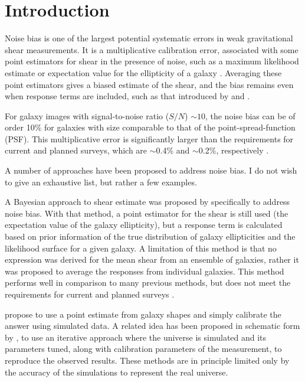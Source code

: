 \documentclass[usegraphicx,usenatbib]{mn2e}
\newcommand{\sn}{$S/N$}
\begin{document}
\section{Introduction} \label{sec:intro}


Noise bias is one of the largest potential systematic errors in weak
gravitational shear measurements.  It is a multiplicative calibration
error, associated with some point estimators for shear in the presence of
noise, such as a maximum likelihood estimate or expectation value for the
ellipticity of a galaxy \citep{HirataAlign04,Refreg12,Melchior12,Miller13}.
Averaging these point estimators gives a biased estimate of the shear, and the
bias remains even when response terms are included, such as that introduced by
\cite{ksb95} and \cite{Bern02}.

For galaxy images with signal-to-noise ratio (\sn) $\sim 10$, the noise bias
can be of order 10\% for galaxies with size comparable to that of the
point-spread-function (PSF).  This multiplicative error is significantly larger
than the requirements for current and planned surveys, which are $\sim$0.4\%
and $\sim$0.2\%, respectively \citep{HutererSystematics06}.

A number of approaches have been proposed to address noise bias. I do not wish
to give an exhaustive list, but rather a few examples.

A Bayesian approach to shear estimate was proposed by \cite{Miller07}
specifically to address noise bias.  With that method, a point estimator for
the shear is still used (the expectation value of the galaxy ellipticity), but
a response term is calculated based on prior information of the true
distribution of galaxy ellipticities and the likelihood surface for a given
galaxy.  A limitation of this method is that no expression was derived for the
mean shear from an ensemble of galaxies, rather it was proposed to average the
responses from individual galaxies.  This method performs well in comparison
to many previous methods, but does not meet the requirements for current and
planned surveys \citep{ba14}.

\cite{Zuntz13} propose to use a point estimate from galaxy shapes and simply
calibrate the answer using simulated data.  A related idea has been proposed in
schematic form by \cite{Refregier13}, to use an iterative approach where the
universe is simulated and its parameters tuned, along with calibration
parameters of the measurement, to reproduce the observed results.  These
methods are in principle limited only by the accuracy of the simulations to
represent the real universe.
\end{document}
